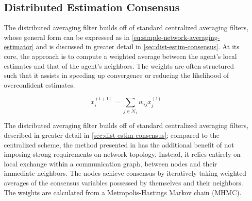 \subsection{Distributed Estimation Consensus}

The distributed averaging filter builds off of standard centralized averaging filters, whose general form can be expressed as in \eqref{eq:simple-network-averaging-estimator} and is discussed in greater detail in \ref{sec:dist-estim-consensus}. At its core, the approach is to compute a weighted average between the agent's local estimates and that of the agent's neighbors. The weights are often structured such that it assists in speeding up convergence or reducing the likelihood of overconfident estimates.

\begin{equation}
    x_i^{(t+1)}=\sum_{j\in\mathcal{N}_i}w_{ij}x_{j}^{(t)}
    \label{eq:simple-network-averaging-estimator}
\end{equation}

The distributed averaging filter builds off of standard centralized averaging filters, described in greater detail in \ref{sec:dist-estim-consensus}; compared to the centralized scheme, the method presented in \cite{xiao2005scheme} has the additional benefit of not imposing strong requirements on network topology. Instead, it relies entirely on local exchange within a communication graph, between nodes and their immediate neighbors. The nodes achieve consensus by iteratively taking weighted averages of the consensus variables possessed by themselves and their neighbors. The weights are calculated from a Metropolis-Hastings Markov chain (MHMC).



